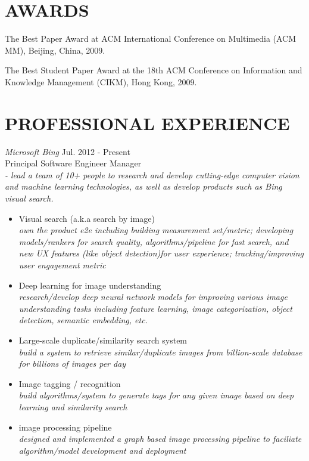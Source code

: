\documentclass{res}
\begin{document}
\begin{resume}

\section{AWARDS}

The Best Paper Award at ACM International Conference on Multimedia (ACM MM), Beijing, China, 2009.

The Best Student Paper Award at the 18th ACM Conference on Information and Knowledge Management (CIKM), Hong Kong, 2009.




\section{{PROFESSIONAL EXPERIENCE}}
{\sl Microsoft Bing} \hfill        Jul. 2012 - Present \\
Principal Software Engineer Manager \\
\emph{ - lead a team of 10+ people to research and develop cutting-edge computer vision and machine learning technologies, as well as develop products such as Bing visual search.}
    \begin{itemize} \itemsep 1pt %
   	\item Visual search (a.k.a search by image) \\
   	\emph{own the product e2e including building measurement set/metric; developing models/rankers for search quality, algorithms/pipeline for fast search, and new UX features (like object detection)for user experience; tracking/improving user engagement metric}
   	
    \item Deep learning for image understanding \\
    \emph{research/develop deep neural network models for improving various image understanding tasks including feature learning, image categorization, object detection, semantic embedding, etc.}
    
    \item Large-scale duplicate/similarity search system \\
    \emph{build a system to retrieve similar/duplicate images from billion-scale database for billions of images per day}
    \item Image tagging / recognition \\
    \emph{build algorithms/system to generate tags for any given image based on deep learning and similarity search}
    \item {image processing pipeline} \\
    \emph{designed and implemented a graph based image processing pipeline to faciliate algorithm/model development and deployment}
    \end{itemize}


\end{resume}
\end{document}
